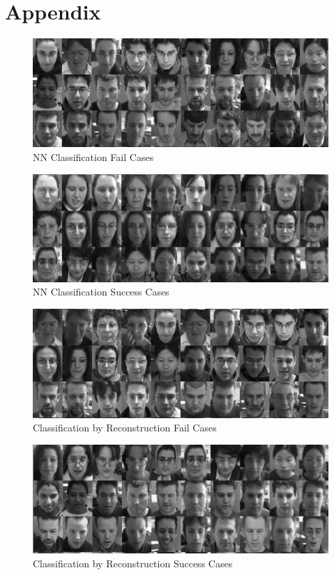 \documentclass[10pt,technote]{IEEEtran}
\begin{document}
\section{Appendix}
\begin{figure}[htb!]
    \centering
    \includegraphics[width=\linewidth]{../results/1bb/NN_FAIL2_cropped.png}
    \caption{NN Classification Fail Cases}
    \label{fig:nn_fails}
\end{figure}

\begin{figure}[htb!]
    \centering
    \includegraphics[width=\linewidth]{../results/1bb/NN_SUCCESS2_cropped.png}
    \caption{NN Classification Success Cases}
    \label{fig:nn_successes}
\end{figure}

\begin{figure}[htb!]
    \centering
    \includegraphics[width=\linewidth]{../results/1bb/REC_FAIL2_cropped.png}
    \caption{Classification by Reconstruction Fail Cases}
    \label{fig:rec_fails}
\end{figure}

\begin{figure}[htb!]
    \centering
    \includegraphics[width=\linewidth]{../results/1bb/REC_SUCCESS2_cropped.png}
    \caption{Classification by Reconstruction Success Cases}
    \label{fig:rec_successes}
\end{figure}
\end{document}
